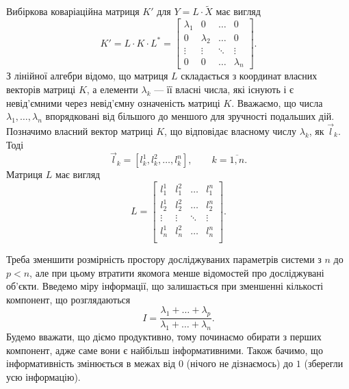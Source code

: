 Вибіркова коваріаційна матриця $K'$ для $Y = L \cdot \tilde{X}$ має вигляд
\begin{equation*}
  K'
  = L \cdot K \cdot L^*
  = \begin{bmatrix}
    \lambda_1 & 0         & \dots  & 0      \\
    0         & \lambda_2 & \dots  & 0      \\
    \vdots    & \vdots    & \ddots & \vdots \\
    0         & 0         & \dots  & \lambda_n
  \end{bmatrix}.
\end{equation*}
З лінійної алгебри відомо, що матриця $L$ складається з координат власних
векторів матриці $K$, а елементи $\lambda_k$ --- її власні числа, які
існують і є невід’ємними через невід’ємну означеність матриці $K$.
Вважаємо, що числа $\lambda_1, \dots, \lambda_n$ впорядковані від більшого до
меншого для зручності подальших дій.
Позначимо власний вектор матриці $K$, що відповідає власному числу $\lambda_k$,
як $\vec{l}_k$. Тоді
\begin{equation*}
  \vec{l}_k
  = \left[ l_k^1, l_k^2, \dots, l_k^n \right],
  \qquad k = \overline{1,n}.
\end{equation*}
Матриця $L$ має вигляд
\begin{equation*}
  L = \begin{bmatrix}
    l_1^1  & l_1^2  & \dots  & l_1^n  \\
    l_2^1  & l_2^2  & \dots  & l_2^n  \\
    \vdots & \vdots & \ddots & \vdots \\
    l_n^1  & l_n^2  & \dots  & l_n^n  \\
  \end{bmatrix}.
\end{equation*}

Треба зменшити розмірність простору досліджуваних параметрів системи з $n$ до
$p<n$, але при цьому втратити якомога менше відомостей про досліджувані
об’єкти.
Введемо міру інформації, що залишається при зменшенні кількості компонент, що
розглядаються
\begin{equation*}
  I = \frac{\lambda_1 + \dots + \lambda_p}{\lambda_1 + \dots + \lambda_n}.
\end{equation*}
Будемо вважати, що діємо продуктивно, тому починаємо обирати з перших
компонент, адже саме вони є найбільш інформативними.
Також бачимо, що інформативність змінюється в межах від $0$
(нічого не дізнаємось) до $1$ (зберегли усю інформацію).

